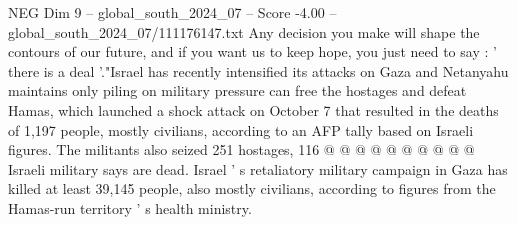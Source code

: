 \begin{textsample}{NEG Dim 9 – global\_south\_2024\_07 – Score -4.00 – global\_south\_2024\_07/111176147.txt}
Any decision you make will shape the contours of our future, and if you want us to keep hope, you just need to say : ' there is a deal '."Israel has recently intensified its attacks on Gaza and Netanyahu maintains only piling on military pressure can free the hostages and defeat Hamas, which launched a shock attack on October 7 that resulted in the deaths of 1,197 people, mostly civilians, according to an AFP tally based on Israeli figures.
The militants also seized 251 hostages, 116 @ @ @ @ @ @ @ @ @ @ Israeli military says are dead.
Israel ' s retaliatory military campaign in Gaza has killed at least 39,145 people, also mostly civilians, according to figures from the Hamas-run territory ' s health ministry.

\end{textsample}
